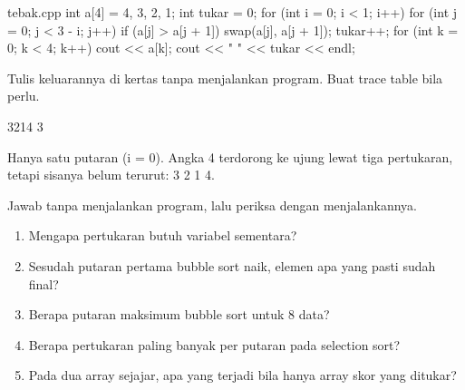 \documentclass[a4paper]{article}
\begin{document}
\begin{MKode}{tebak.cpp}
int a[4] = {4, 3, 2, 1};
int tukar = 0;
for (int i = 0; i < 1; i++) {
    for (int j = 0; j < 3 - i; j++) {
        if (a[j] > a[j + 1]) {
            swap(a[j], a[j + 1]);
            tukar++;
        }
    }
}
for (int k = 0; k < 4; k++) cout << a[k];
cout << " " << tukar << endl;
\end{MKode}
\begin{Tebak}[]
Tulis keluarannya di kertas tanpa menjalankan program. Buat trace table bila perlu.
\end{Tebak}
\begin{Jawaban}[]
\begin{MKeluaran}[]
3214 3
\end{MKeluaran}
Hanya satu putaran (i = 0). Angka 4 terdorong ke ujung lewat tiga pertukaran, tetapi sisanya belum terurut: 3 2 1 4.
\end{Jawaban}
\par\vspace{4pt}\par\vspace{6pt}
Jawab tanpa menjalankan program, lalu periksa dengan menjalankannya.
\begin{enumerate}
\item Mengapa pertukaran butuh variabel sementara?
\item Sesudah putaran pertama bubble sort naik, elemen apa yang pasti sudah final?
\item Berapa putaran maksimum bubble sort untuk 8 data?
\item Berapa pertukaran paling banyak per putaran pada selection sort?
\item Pada dua array sejajar, apa yang terjadi bila hanya array skor yang ditukar?
\end{enumerate}
\end{document}
